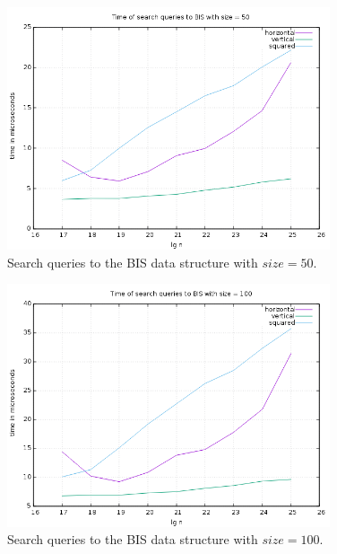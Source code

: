 \begin{figure}[h]
    \centering
    \includegraphics[width = 0.85\textwidth]{pictures/analysis/smalls/all_50.png}
    \caption{Search queries to the BIS data structure with $size=50$.}\label{fig:all_50}
\end{figure}


\begin{figure}[h]
    \centering
    \includegraphics[width = 0.85\textwidth]{pictures/analysis/smalls/all_100.png}
    \caption{Search queries to the BIS data structure with $size=100$.}\label{fig:all_100}
\end{figure}


